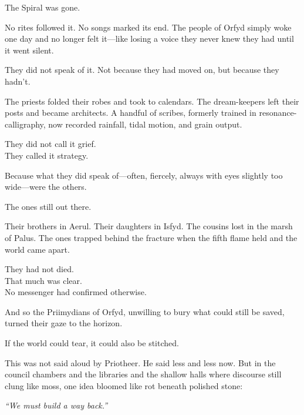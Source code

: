 \documentclass[12pt]{article}
\begin{document}
The Spiral was gone.

\vspace{0.5em}
No rites followed it. No songs marked its end. The people of Orfyd simply woke one day and no longer felt it---like losing a voice they never knew they had until it went silent.

\vspace{0.5em}
They did not speak of it. Not because they had moved on, but because they hadn't.

\vspace{0.5em}
The priests folded their robes and took to calendars. The dream-keepers left their posts and became architects. A handful of scribes, formerly trained in resonance-calligraphy, now recorded rainfall, tidal motion, and grain output.

\vspace{0.5em}
They did not call it grief.\\
They called it strategy.

\vspace{0.5em}
Because what they did speak of---often, fiercely, always with eyes slightly too wide---were the others.

\vspace{0.5em}
The ones still out there.

\vspace{0.5em}
Their brothers in Aerul. Their daughters in Isfyd. The cousins lost in the marsh of Palus. The ones trapped behind the fracture when the fifth flame held and the world came apart.

\vspace{0.5em}
They had not died.\\
That much was clear.\\
No messenger had confirmed otherwise.

\vspace{0.5em}
And so the Priimydians of Orfyd, unwilling to bury what could still be saved, turned their gaze to the horizon.

\vspace{0.5em}
If the world could tear, it could also be stitched.

\vspace{0.5em}
This was not said aloud by Priotheer. He said less and less now. But in the council chambers and the libraries and the shallow halls where discourse still clung like moss, one idea bloomed like rot beneath polished stone:

\vspace{0.5em}
\textit{``We must build a way back.''}
\end{document}
